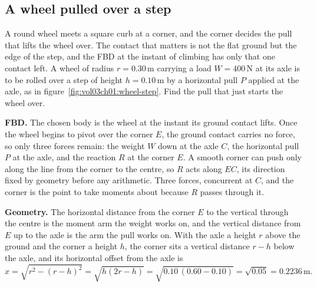 \subsection{A wheel pulled over a step}



A round wheel meets a square curb at a corner, and the corner decides the pull
that lifts the wheel over. The contact that matters is not the flat ground but
the edge of the step, and the FBD at the instant of climbing has only that one
contact left. A wheel of radius $r = 0.30\,\si{\meter}$ carrying a load $W =
400\,\text{N}$ at its axle is to be rolled over a step of height $h = 0.10\,
\si{\meter}$ by a horizontal pull $P$ applied at the axle, as in
figure~\ref{fig:vol03ch01:wheel-step}. Find the pull that just starts the
wheel over.

\textbf{FBD.} The chosen body is the wheel at the instant its ground contact
lifts. Once the wheel begins to pivot over the corner $E$, the ground contact
carries no force, so only three forces remain: the weight $W$ down at the axle
$C$, the horizontal pull $P$ at the axle, and the reaction $R$ at the corner
$E$. A smooth corner can push only along the line from the corner to the
centre, so $R$ acts along $EC$, its direction fixed by geometry before any
arithmetic. Three forces, concurrent at $C$, and the corner is the point to
take moments about because $R$ passes through it.

\textbf{Geometry.} The horizontal distance from the corner $E$ to the vertical
through the centre is the moment arm the weight works on, and the vertical
distance from $E$ up to the axle is the arm the pull works on. With the axle a
height $r$ above the ground and the corner a height $h$, the corner sits a
vertical distance $r - h$ below the axle, and its horizontal offset from the
axle is
\[
x = \sqrt{r^2 - (r - h)^2} = \sqrt{h(2r - h)}
= \sqrt{0.10\,(0.60 - 0.10)} = \sqrt{0.05} = 0.2236\,\si{\meter}.
\]

